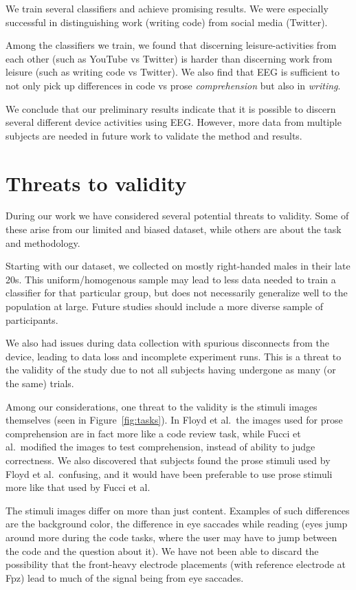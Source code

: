We train several classifiers and achieve promising results. We were especially successful in distinguishing work (writing code) from social media (Twitter).

Among the classifiers we train, we found that discerning leisure-activities from each other (such as YouTube vs Twitter) is harder than discerning work from leisure (such as writing code vs Twitter). We also find that EEG is sufficient to not only pick up differences in code vs prose \emph{comprehension} but also in \emph{writing}.

We conclude that our preliminary results indicate that it is possible to discern several different device activities using EEG\@. However, more data from multiple subjects are needed in future work to validate the method and results. 

\section{Threats to validity}\label{section:threats}

    During our work we have considered several potential threats to validity. Some of these arise from our limited and biased dataset, while others are about the task and methodology.

    Starting with our dataset, we collected on mostly right-handed males in their late 20s. This uniform/homogenous sample may lead to less data needed to train a classifier for that particular group, but does not necessarily generalize well to the population at large. Future studies should include a more diverse sample of participants.

    We also had issues during data collection with spurious disconnects from the device, leading to data loss and incomplete experiment runs. This is a threat to the validity of the study due to not all subjects having undergone as many (or the same) trials.

    Among our considerations, one threat to the validity is the stimuli images themselves (seen in Figure~\ref{fig:tasks}). In Floyd et al.~the images used for prose comprehension are in fact more like a code review task, while Fucci et al.~modified the images to test comprehension, instead of ability to judge correctness. We also discovered that subjects found the prose stimuli used by Floyd et al.~confusing, and it would have been preferable to use prose stimuli more like that used by Fucci et al.

    The stimuli images differ on more than just content. Examples of such differences are the background color, the difference in eye saccades while reading (eyes jump around more during the code tasks, where the user may have to jump between the code and the question about it). We have not been able to discard the possibility that the front-heavy electrode placements (with reference electrode at Fpz) lead to much of the signal being from eye saccades. 

